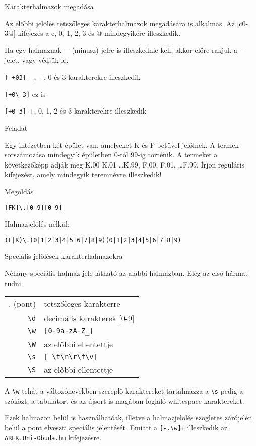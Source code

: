 \documentclass[
    ignorenonframetext
    ]{beamer}
\begin{document}
\begin{frame}[fragile]
    {Karakterhalmazok megadása}

    Az előbbi jelölés tetszőleges karakterhalmazok megadására is alkalmas.
    Az [c0-3@] kifejezés a c, 0, 1, 2, 3 és @ mindegyikére illeszkedik.

    Ha egy halmaznak $-$ (minusz) jelre is illeszkednie kell, akkor
    előre rakjuk a $-$ jelet, vagy védjük le.

    \verb![-+03]! \qquad $-$, +, 0 és 3 karakterekre illeszkedik

    \verb![+0\-3]! \qquad ez is

    \verb![+0-3]! \qquad +, 0, 1, 2 és 3 karakterekre illeszkedik
\end{frame}

\begin{frame}[fragile]
    {Feladat}

    Egy intézetben két épület van, amelyeket K és F betűvel jelölnek. A
    termek sorszámozása mindegyik épületben 0-tól 99-ig történik. A
    termeket a következőképp adják meg K.00 K.01 \ldots K.99, F.00,
    F.01, \ldots F.99. Írjon reguláris kifejezést, amely mindegyik
    teremnévre illeszkedik!

    \megoldasjon
\end{frame}

\begin{frame}[fragile]
    {Megoldás}

    \verb![FK]\.[0-9][0-9]!

    Halmazjelölés nélkül:

    \verb!(F|K)\.(0|1|2|3|4|5|6|7|8|9)(0|1|2|3|4|5|6|7|8|9)!
\end{frame}

\begin{frame}[fragile]
    {Speciális jelölések karakterhalmazokra}

    Néhány speciális halmaz jele látható az alábbi halmazban. Elég az
    első hármat tudni.

    \vfill
    \begin{tabular}{rl}
        . (pont)  & tetszőleges karakterre\\
        \verb"\d" & decimális karakterek [0-9]\\
        \verb"\w" & \verb"[0-9a-zA-Z_]"\\
        \verb"\W" & az előbbi ellentettje\\
        \verb"\s" & \verb"[ \t\n\r\f\v]"\\
        \verb"\S" & az előbbi ellentettje\\
    \end{tabular}

    \vfill
    A \verb"\w" tehát a változónevekben szereplő karaktereket
    tartalmazza a \verb"\s" pedig a szóközt, a tabulátort és az újsort
    is magában foglaló whitespace karaktereket.

    \vfill
    Ezek halmazon belül is használhatóak, illetve a halmazjelölés
    szögletes zárójelén belül a pont elveszti speciális jelentését.
    Emiatt a \verb"[-.\w]+" illeszkedik az
    \verb"AREK.Uni-Obuda.hu" kifejezésre.
\end{frame}
\end{document}

